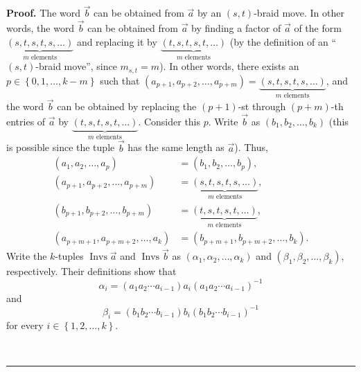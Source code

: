 \documentclass[numbers=enddot,12pt,final,onecolumn,notitlepage,abstracton]{scrartcl}%
\theoremstyle{definition}
\newenvironment{proof}[1][Proof]{\noindent\textbf{#1.} }{\ \rule{0.5em}{0.5em}}
\begin{document}
\begin{proof}
The word $\overrightarrow{b}$ can be obtained from $\overrightarrow{a}$ by an
$\left(  s,t\right)  $-braid move. In other words, the word
$\overrightarrow{b}$ can be obtained from $\overrightarrow{a}$ by finding a
factor of $\overrightarrow{a}$ of the form $\underbrace{\left(
s,t,s,t,s,\ldots\right)  }_{m\text{ elements}}$ and replacing it by
$\underbrace{\left(  t,s,t,s,t,\ldots\right)  }_{m\text{ elements}}$ (by the
definition of an \textquotedblleft$\left(  s,t\right)  $-braid
move\textquotedblright, since $m_{s,t}=m$). In other words, there exists an
$p\in\left\{  0,1,\ldots,k-m\right\}  $ such that $\left(  a_{p+1}%
,a_{p+2},\ldots,a_{p+m}\right)  =\underbrace{\left(  s,t,s,t,s,\ldots\right)
}_{m\text{ elements}}$, and the word $\overrightarrow{b}$ can be obtained by
replacing the $\left(  p+1\right)  $-st through $\left(  p+m\right)  $-th
entries of $\overrightarrow{a}$ by $\underbrace{\left(  t,s,t,s,t,\ldots
\right)  }_{m\text{ elements}}$. Consider this $p$. Write $\overrightarrow{b}$
as $\left(  b_{1},b_{2},\ldots,b_{k}\right)  $ (this is possible since the
tuple $\overrightarrow{b}$ has the same length as $\overrightarrow{a}$). Thus,%
\begin{align}
\left(  a_{1},a_{2},\ldots,a_{p}\right)   &  =\left(  b_{1},b_{2},\ldots
,b_{p}\right)  ,\label{pf.prop.Invsles.b.1}\\
\left(  a_{p+1},a_{p+2},\ldots,a_{p+m}\right)   &  =\underbrace{\left(
s,t,s,t,s,\ldots\right)  }_{m\text{ elements}},\label{pf.prop.Invsles.b.2}\\
\left(  b_{p+1},b_{p+2},\ldots,b_{p+m}\right)   &  =\underbrace{\left(
t,s,t,s,t,\ldots\right)  }_{m\text{ elements}},\label{pf.prop.Invsles.b.3}\\
\left(  a_{p+m+1},a_{p+m+2},\ldots,a_{k}\right)   &  =\left(  b_{p+m+1}%
,b_{p+m+2},\ldots,b_{k}\right)  . \label{pf.prop.Invsles.b.4}%
\end{align}
Write the $k$-tuples $\operatorname*{Invs}\overrightarrow{a}$ and
$\operatorname*{Invs}\overrightarrow{b}$ as $\left(  \alpha_{1},\alpha
_{2},\ldots,\alpha_{k}\right)  $ and $\left(  \beta_{1},\beta_{2},\ldots
,\beta_{k}\right)  $, respectively. Their definitions show that%
\begin{equation}
\alpha_{i}=\left(  a_{1}a_{2}\cdots a_{i-1}\right)  a_{i}\left(  a_{1}%
a_{2}\cdots a_{i-1}\right)  ^{-1} \label{pf.prop.Invsles.b.alpha}%
\end{equation}
and%
\begin{equation}
\beta_{i}=\left(  b_{1}b_{2}\cdots b_{i-1}\right)  b_{i}\left(  b_{1}%
b_{2}\cdots b_{i-1}\right)  ^{-1} \label{pf.prop.Invsles.b.beta}%
\end{equation}
for every $i\in\left\{  1,2,\ldots,k\right\}  $.


\end{proof}
\end{document}
